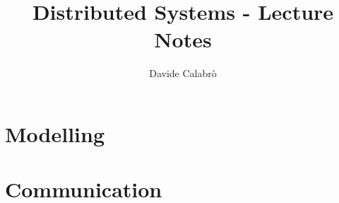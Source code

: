 \documentclass{article}
\title{Distributed Systems - Lecture Notes}
\author{Davide Calabrò}
\begin{document}
    \maketitle
    \newpage
    
    \tableofcontents
    
    \newpage

    \section{Modelling}
    
    
    \newpage
    
    \section{Communication}
    
\end{document}
